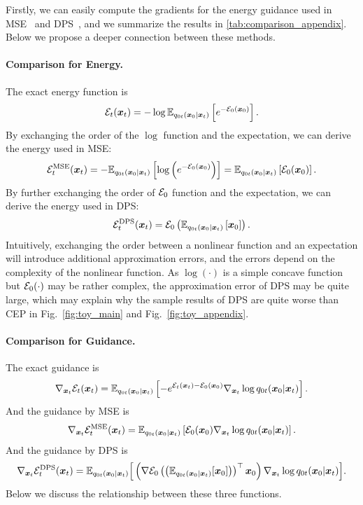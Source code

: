 Firstly, we can easily compute the gradients for the energy guidance used in MSE~\citep{diffuser,bao2022equivariant} and DPS~\citep{ho2022video,chung2022diffusion}, and we summarize the results in \cref{tab:comparison_appendix}. Below we propose a deeper connection between these methods.

\paragraph{Comparison for Energy.}
The exact energy function is
\begin{equation*}
    {\mathcal{E}}_t({\bm{x}}_t) = -\log\mathbb{E}_{q_{0t}({\bm{x}}_0|{\bm{x}}_t)}\left[e^{-{\mathcal{E}}_0({\bm{x}}_0)}\right].
\end{equation*}
By exchanging the order of the $\log$ function and the expectation, we can derive the energy used in MSE:
\begin{equation*}
    {\mathcal{E}}_t^{\text{MSE}}({\bm{x}}_t) = -\mathbb{E}_{q_{0t}({\bm{x}}_0|{\bm{x}}_t)}\left[\log\left(e^{-{\mathcal{E}}_0({\bm{x}}_0)}\right)\right] = \mathbb{E}_{q_{0t}({\bm{x}}_0|{\bm{x}}_t)}\left[{\mathcal{E}}_0({\bm{x}}_0)\right].
\end{equation*}
By further exchanging the order of ${\mathcal{E}}_0$ function and the expectation, we can derive the energy used in DPS:
\begin{equation*}
    {\mathcal{E}}_t^{\text{DPS}}({\bm{x}}_t) = {\mathcal{E}}_0\left(\mathbb{E}_{q_{0t}({\bm{x}}_0|{\bm{x}}_t)}\left[{\bm{x}}_0\right]\right).
\end{equation*}
Intuitively, exchanging the order between a nonlinear function and an expectation will introduce additional approximation errors, and the errors depend on the complexity of the nonlinear function. As $\log(\cdot)$ is a simple concave function but ${\mathcal{E}}_0(\cdot)$ may be rather complex, the approximation error of DPS may be quite large, which may explain why the sample results of DPS are quite worse than CEP in Fig.~\ref{fig:toy_main} and Fig.~\ref{fig:toy_appendix}.


\paragraph{Comparison for Guidance.}
The exact guidance is
\begin{equation}
\label{Eqn:appendix_exact_guidance}
    \nabla_{{\bm{x}}_t}{\mathcal{E}}_t({\bm{x}}_t) = \mathbb{E}_{q_{0t}({\bm{x}}_0|{\bm{x}}_t)}\left[-e^{{\mathcal{E}}_t({\bm{x}}_t)-{\mathcal{E}}_0({\bm{x}}_0)}\nabla_{{\bm{x}}_t}\log q_{0t}({\bm{x}}_0|{\bm{x}}_t)\right].
\end{equation}
And the guidance by MSE is
\begin{equation*}
    \nabla_{{\bm{x}}_t}{\mathcal{E}}_t^{\text{MSE}}({\bm{x}}_t) = \mathbb{E}_{q_{0t}({\bm{x}}_0|{\bm{x}}_t)}\left[
        {\mathcal{E}}_0({\bm{x}}_0)\nabla_{{\bm{x}}_t}\log q_{0t}({\bm{x}}_0|{\bm{x}}_t)
    \right].
\end{equation*}
And the guidance by DPS is
\begin{equation*}
    \nabla_{{\bm{x}}_t}{\mathcal{E}}_t^{\text{DPS}}({\bm{x}}_t) = \mathbb{E}_{q_{0t}({\bm{x}}_0|{\bm{x}}_t)}\Big[\left(\nabla{\mathcal{E}}_0\left(\left(\mathbb{E}_{q_{0t}({\bm{x}}_0|{\bm{x}}_t)}[{\bm{x}}_0]\right)\right)^\top {\bm{x}}_0\right) \nabla_{{\bm{x}}_t}\log q_{0t}({\bm{x}}_0|{\bm{x}}_t)\Big].
\end{equation*}
Below we discuss the relationship between these three functions.

